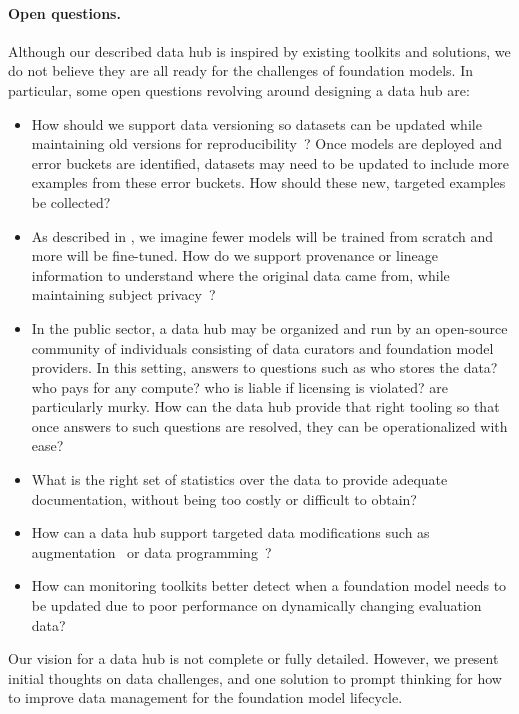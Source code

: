 \paragraph{Open questions.} Although our described data hub is inspired by existing toolkits and solutions, we do not believe they are all ready for the challenges of foundation models. In particular, some open questions revolving around designing a data hub are:
\begin{itemize}
    \item How should we support data versioning so datasets can be updated while maintaining old versions for reproducibility~\citep{agrawal2019cloudy}? Once models are deployed and error buckets are identified, datasets may need to be updated to include more examples from these error buckets. How should these new, targeted examples be collected?
    \item As described in , we imagine fewer models will be trained from scratch and more will be fine-tuned. How do we support provenance or lineage information to understand where the original data came from, while maintaining subject privacy~\citep{chen2015access}?
    \item In the public sector, a data hub may be organized and run by an open-source community of individuals consisting of data curators and foundation model providers. In this setting, answers to questions such as who stores the data? who pays for any compute? who is liable if licensing is violated? are particularly murky. How can the data hub provide that right tooling so that once answers to such questions are resolved, they can be operationalized with ease?
    \item What is the right set of statistics over the data to provide adequate documentation, without being too costly or difficult to obtain?
    \item How can a data hub support targeted data modifications such as augmentation~\citep{ma2019nlpaug, shorten2019survey} or data programming~\citep{ratner2017snorkel}?
    \item How can monitoring toolkits better detect when a foundation model needs to be updated due to poor performance on dynamically changing evaluation data?
\end{itemize}

Our vision for a data hub is not complete or fully detailed. However, we present initial thoughts on data challenges, and one solution to prompt thinking for how to improve data management for the foundation model lifecycle.